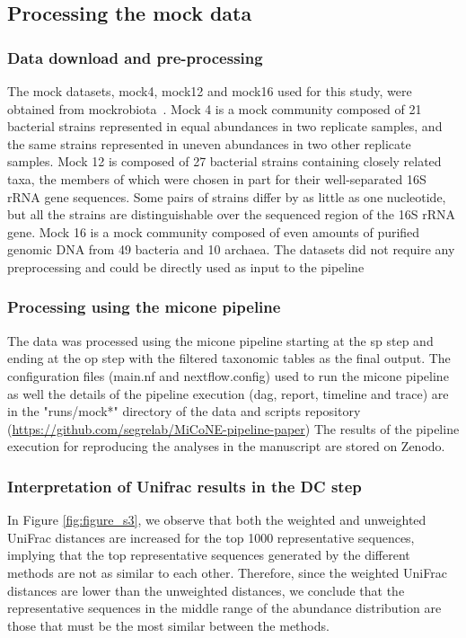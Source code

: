 \documentclass[letterpaper,12pt]{article}
\begin{document}
  \subsection*{Processing the mock data}

    \subsubsection*{Data download and pre-processing}
    The mock datasets, mock4, mock12 and mock16 used for this study, were obtained from mockrobiota~\cite{Bokulich2016}.
    Mock 4 is a mock community composed of 21 bacterial strains represented in equal abundances in two replicate samples, and the same strains represented in uneven abundances in two other replicate samples.
    Mock 12 is composed of 27 bacterial strains containing closely related taxa, the members of which were chosen in part for their well-separated 16S rRNA gene sequences. Some pairs of strains differ by as little as one nucleotide, but all the strains are distinguishable over the sequenced region of the 16S rRNA gene.
    Mock 16 is a mock community composed of even amounts of purified genomic DNA from 49 bacteria and 10 archaea.
    The datasets did not require any preprocessing and could be directly used as input to the pipeline

    \subsubsection*{Processing using the \ac{micone} pipeline}
    The data was processed using the \ac{micone} pipeline starting at the \ac{sp} step and ending at the \ac{op} step with the filtered taxonomic tables as the final output.
    The configuration files (main.nf and nextflow.config) used to run the \ac{micone} pipeline as well the details of the pipeline execution (dag, report, timeline and trace) are in the "runs/mock*" directory of the data and scripts repository (\href{https://github.com/segrelab/MiCoNE-pipeline-paper}{https://github.com/segrelab/MiCoNE-pipeline-paper})
    The results of the pipeline execution for reproducing the analyses in the manuscript are stored on Zenodo.

    \subsubsection*{Interpretation of Unifrac results in the DC step}
  In Figure \ref{fig:figure_s3}, we observe that both the weighted and unweighted UniFrac distances are increased for the top 1000 representative sequences, implying that the top representative sequences generated by the different methods are not as similar to each other.
  Therefore, since the weighted UniFrac distances are lower than the unweighted distances, we conclude that the representative sequences in the middle range of the abundance distribution are those that must be the most similar between the methods.
\end{document}
